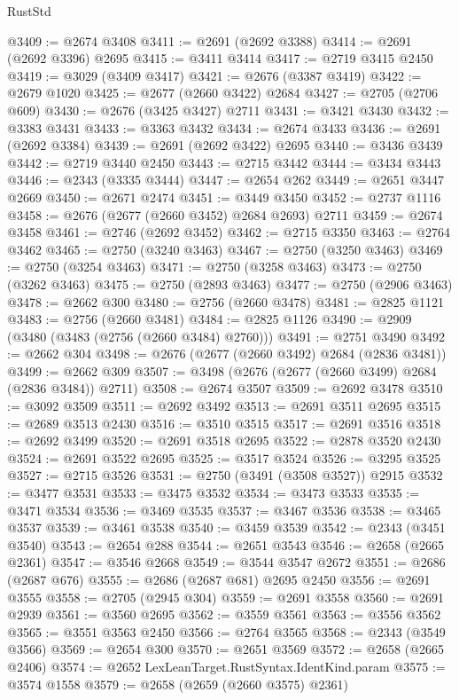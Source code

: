 \begin{lexlean}{RustStd}
\begin{coremodule}
@3409 := @2674 @3408
@3411 := @2691 (@2692 @3388)
@3414 := @2691 (@2692 @3396) @2695
@3415 := @3411 @3414
@3417 := @2719 @3415 @2450
@3419 := @3029 (@3409 @3417)
@3421 := @2676 (@3387 @3419)
@3422 := @2679 @1020
@3425 := @2677 (@2660 @3422) @2684
@3427 := @2705 (@2706 @609)
@3430 := @2676 (@3425 @3427) @2711
@3431 := @3421 @3430
@3432 := @3383 @3431
@3433 := @3363 @3432
@3434 := @2674 @3433
@3436 := @2691 (@2692 @3384)
@3439 := @2691 (@2692 @3422) @2695
@3440 := @3436 @3439
@3442 := @2719 @3440 @2450
@3443 := @2715 @3442
@3444 := @3434 @3443
@3446 := @2343 (@3335 @3444)
@3447 := @2654 @262
@3449 := @2651 @3447 @2669
@3450 := @2671 @2474
@3451 := @3449 @3450
@3452 := @2737 @1116
@3458 := @2676 (@2677 (@2660 @3452) @2684 @2693) @2711
@3459 := @2674 @3458
@3461 := @2746 (@2692 @3452)
@3462 := @2715 @3350
@3463 := @2764 @3462
@3465 := @2750 (@3240 @3463)
@3467 := @2750 (@3250 @3463)
@3469 := @2750 (@3254 @3463)
@3471 := @2750 (@3258 @3463)
@3473 := @2750 (@3262 @3463)
@3475 := @2750 (@2893 @3463)
@3477 := @2750 (@2906 @3463)
@3478 := @2662 @300
@3480 := @2756 (@2660 @3478)
@3481 := @2825 @1121
@3483 := @2756 (@2660 @3481)
@3484 := @2825 @1126
@3490 := @2909 (@3480 (@3483 (@2756 (@2660 @3484) @2760)))
@3491 := @2751 @3490
@3492 := @2662 @304
@3498 := @2676 (@2677 (@2660 @3492) @2684 (@2836 @3481))
@3499 := @2662 @309
@3507 := @3498 (@2676 (@2677 (@2660 @3499) @2684 (@2836 @3484)) @2711)
@3508 := @2674 @3507
@3509 := @2692 @3478
@3510 := @3092 @3509
@3511 := @2692 @3492
@3513 := @2691 @3511 @2695
@3515 := @2689 @3513 @2430
@3516 := @3510 @3515
@3517 := @2691 @3516
@3518 := @2692 @3499
@3520 := @2691 @3518 @2695
@3522 := @2878 @3520 @2430
@3524 := @2691 @3522 @2695
@3525 := @3517 @3524
@3526 := @3295 @3525
@3527 := @2715 @3526
@3531 := @2750 (@3491 (@3508 @3527)) @2915
@3532 := @3477 @3531
@3533 := @3475 @3532
@3534 := @3473 @3533
@3535 := @3471 @3534
@3536 := @3469 @3535
@3537 := @3467 @3536
@3538 := @3465 @3537
@3539 := @3461 @3538
@3540 := @3459 @3539
@3542 := @2343 (@3451 @3540)
@3543 := @2654 @288
@3544 := @2651 @3543
@3546 := @2658 (@2665 @2361)
@3547 := @3546 @2668
@3549 := @3544 @3547 @2672
@3551 := @2686 (@2687 @676)
@3555 := @2686 (@2687 @681) @2695 @2450
@3556 := @2691 @3555
@3558 := @2705 (@2945 @304)
@3559 := @2691 @3558
@3560 := @2691 @2939
@3561 := @3560 @2695
@3562 := @3559 @3561
@3563 := @3556 @3562
@3565 := @3551 @3563 @2450
@3566 := @2764 @3565
@3568 := @2343 (@3549 @3566)
@3569 := @2654 @300
@3570 := @2651 @3569
@3572 := @2658 (@2665 @2406)
@3574 := @2652 LexLeanTarget.RustSyntax.IdentKind.param
@3575 := @3574 @1558
@3579 := @2658 (@2659 (@2660 @3575) @2361)

\end{coremodule}
\end{lexlean}
